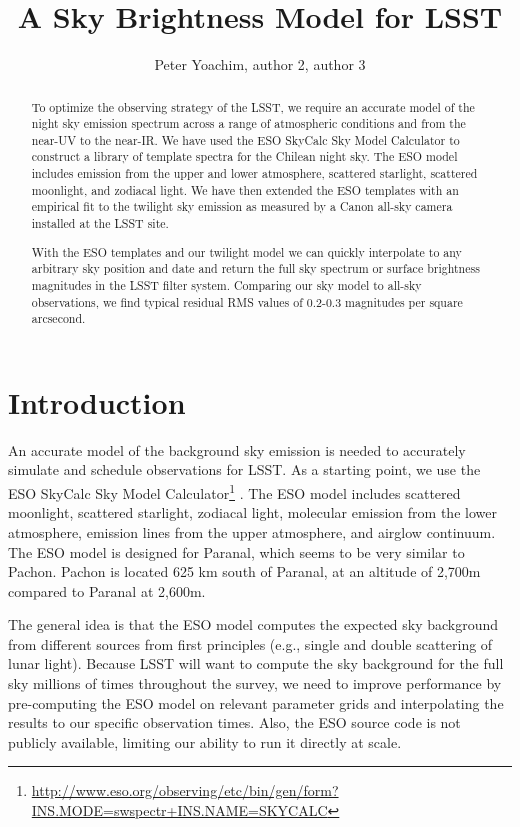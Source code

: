\documentclass[]{spie}
\begin{document}
\title{A Sky Brightness Model for LSST}


\author{Peter Yoachim, author 2, author 3}


\begin{abstract}
  To optimize the observing strategy of the LSST, we require an accurate model of the night sky emission spectrum across a range of atmospheric conditions and from the near-UV to the near-IR.  We have used the ESO SkyCalc Sky Model Calculator \citep{Noll12,Jones13} to construct a library of template spectra for the Chilean night sky.  The ESO model includes emission from the upper and lower atmosphere, scattered starlight, scattered moonlight, and zodiacal light.
  We have then extended the ESO templates with an empirical fit to the twilight sky emission as measured by a Canon all-sky camera installed at the LSST site.

  With the ESO templates and our twilight model we can quickly interpolate to any arbitrary sky position and date and return the full sky spectrum or surface brightness magnitudes in the LSST filter system. Comparing our sky model to all-sky observations, we find typical residual RMS values of 0.2-0.3 magnitudes per square arcsecond.
\end{abstract}


\section{Introduction}

An accurate model of the background sky emission is needed to accurately simulate and schedule observations for LSST.  As a starting point, we use the ESO SkyCalc Sky Model Calculator\footnote{\url{http://www.eso.org/observing/etc/bin/gen/form?} \url{INS.MODE=swspectr+INS.NAME=SKYCALC}} \citep{Noll12,Jones13}.  The ESO model includes scattered moonlight, scattered starlight, zodiacal light, molecular emission from the lower atmosphere, emission lines from the upper atmosphere, and airglow continuum.  The ESO model is designed for Paranal, which seems to be very similar to Pachon.  Pachon is located 625 km south of Paranal, at an altitude of 2,700m compared to Paranal at 2,600m.  

The general idea is that the ESO model computes the expected sky background from different sources from first principles (e.g., single and double scattering of lunar light). Because LSST will want to compute the sky background for the full sky millions of times throughout the survey, we need to improve performance by pre-computing the ESO model on relevant parameter grids and interpolating the results to our specific observation times. Also, the ESO source code is not publicly available, limiting our ability to run it directly at scale.
\end{document}
